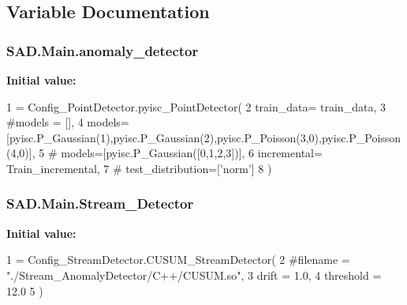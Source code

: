 \subsection{Variable Documentation}
\subsubsection[{\texorpdfstring{anomaly\+\_\+detector}{anomaly_detector}}]{\setlength{\rightskip}{0pt plus 5cm}S\+A\+D.\+Main.\+anomaly\+\_\+detector}\hypertarget{namespaceSAD_1_1Main_a6fae104012e304d1adde92108c00b261}{}\label{namespaceSAD_1_1Main_a6fae104012e304d1adde92108c00b261}
{\bfseries Initial value\+:}
\begin{DoxyCode}
1 = Config\_PointDetector.pyisc\_PointDetector(
2     train\_data= train\_data,
3     \textcolor{comment}{#models = [],}
4     models=[pyisc.P\_Gaussian(1),pyisc.P\_Gaussian(2),pyisc.P\_Poisson(3,0),pyisc.P\_Poisson(4,0)],
5     \textcolor{comment}{# models=[pyisc.P\_Gaussian([0,1,2,3])],}
6     incremental= Train\_incremental,
7     \textcolor{comment}{# test\_distribution=['norm']}
8 )
\end{DoxyCode}
\subsubsection[{\texorpdfstring{Stream\+\_\+\+Detector}{Stream_Detector}}]{\setlength{\rightskip}{0pt plus 5cm}S\+A\+D.\+Main.\+Stream\+\_\+\+Detector}\hypertarget{namespaceSAD_1_1Main_adedbb4deb28e6f7b98f42f21f1330352}{}\label{namespaceSAD_1_1Main_adedbb4deb28e6f7b98f42f21f1330352}
{\bfseries Initial value\+:}
\begin{DoxyCode}
1 = Config\_StreamDetector.CUSUM\_StreamDetector(
2     \textcolor{comment}{#filename = "./Stream\_AnomalyDetector/C++/CUSUM.so",}
3     drift = 1.0,
4     threshold = 12.0
5 )
\end{DoxyCode}
